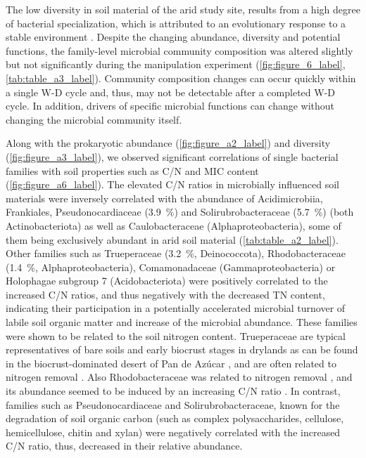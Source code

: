 The low diversity in soil material of the arid study site, results from a high degree of bacterial specialization, which is attributed to an evolutionary response to a stable environment \citep{Rodriguez2022}. 
Despite the changing abundance, diversity and potential functions, the family-level microbial community composition was altered slightly but not significantly during the manipulation experiment (\cref{fig:figure_6_label}, \cref{tab:table_a3_label}). 
Community composition changes can occur quickly within a single W-D cycle \citep{Evans2012} and, thus, may not be detectable after a completed W-D cycle. 
In addition, drivers of specific microbial functions can change without changing the microbial community itself.

Along with the prokaryotic abundance (\cref{fig:figure_a2_label}) and diversity (\cref{fig:figure_a3_label}), we observed significant correlations of single bacterial families with soil properties such as C/N and MIC content (\cref{fig:figure_a6_label}). 
The elevated C/N ratios in microbially influenced soil materials were inversely correlated with the abundance of Acidimicrobiia, Frankiales, Pseudonocardiaceae (\SI{3.9}{\percent}) and Solirubrobacteraceae (\SI{5.7}{\percent}) (both Actinobacteriota) as well as Caulobacteraceae (Alphaproteobacteria), some of them being exclusively abundant in arid soil material (\cref{tab:table_a2_label}). 
Other families such as Trueperaceae (\SI{3.2}{\percent}, Deinococcota), Rhodobacteraceae (\SI{1.4}{\percent}, Alphaproteobacteria), Comamonadaceae (Gammaproteobacteria) or Holophagae subgroup 7 (Acidobacteriota) were positively correlated to the increased C/N ratios, and thus negatively with the decreased TN content, indicating their participation in a potentially accelerated microbial turnover of labile soil organic matter and increase of the microbial abundance. 
These families were shown to be related to the soil nitrogen content. 
Trueperaceae are typical representatives of bare soils and early biocrust stages in drylands \citep{Albuquerque2005, Maier2018} as can be found in the biocrust-dominated desert of Pan de Az{\'u}car \citep{Bernhard2018b}, and are often related to nitrogen removal \citep{GonzalezBlanco2020}. 
Also Rhodobacteraceae was related to nitrogen removal \citep{Jia2020}, and its abundance seemed to be induced by an increasing C/N ratio \citep{Guo2020}. 
In contrast, families such as Pseudonocardiaceae and Solirubrobacteraceae, known for the degradation of soil organic carbon (such as complex polysaccharides, cellulose, hemicellulose, chitin and xylan) \citep{Broadbent2022, Yeager2017} were negatively correlated with the increased C/N ratio, thus, decreased in their relative abundance. 
